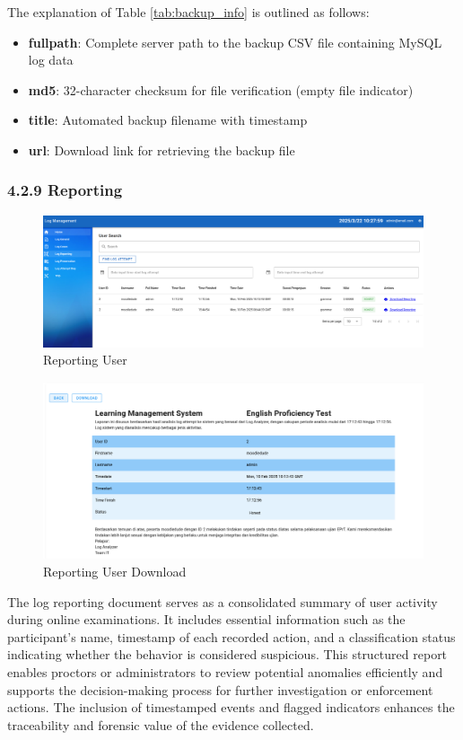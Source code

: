 The explanation of Table \ref{tab:backup_info} is outlined as follows:

\begin{itemize}
	\item \textbf{fullpath}: Complete server path to the backup CSV file containing MySQL log data
	\item \textbf{md5}: 32-character checksum for file verification (empty file indicator)
	\item \textbf{title}: Automated backup filename with timestamp
	\item \textbf{url}: Download link for retrieving the backup file
\end{itemize}

\subsubsection{4.2.9 Reporting}
\begin{figure}[H] 
	\centering
	\includegraphics[width=18cm]{figure/log_reporting_1.png}
	\caption{Reporting User}
	\label{fig:log_reporting_1}
\end{figure}

\begin{figure}[H] 
	\centering
	\includegraphics[width=18cm]{figure/log_reporting_2.png}
	\caption{Reporting User Download}
	\label{fig:log_reporting_2}
\end{figure}

The log reporting document serves as a consolidated summary of user activity during online examinations. It includes essential information such as the participant's name, timestamp of each recorded action, and a classification status indicating whether the behavior is considered suspicious. This structured report enables proctors or administrators to review potential anomalies efficiently and supports the decision-making process for further investigation or enforcement actions. The inclusion of timestamped events and flagged indicators enhances the traceability and forensic value of the evidence collected.
